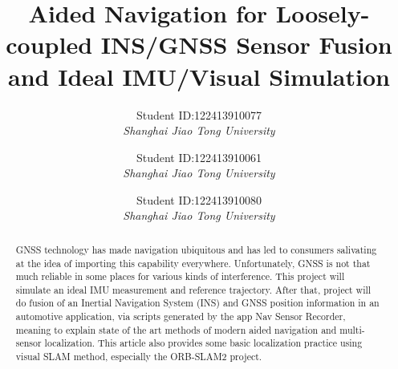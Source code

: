 \documentclass[conference]{IEEEtran}
\begin{document}
\title{Aided Navigation for Loosely-coupled INS/GNSS Sensor Fusion and Ideal IMU/Visual Simulation\\
}

\author{
Student ID:122413910077\\
\textit{Shanghai Jiao Tong University}\\

\and
{}
Student ID:122413910061\\
\textit{Shanghai Jiao Tong University}\\

\and
{}
Student ID:122413910080\\
\textit{Shanghai Jiao Tong University}\\

}

\maketitle

\begin{abstract}
GNSS technology has made navigation ubiquitous and has led to consumers salivating at the idea of importing this capability everywhere. Unfortunately, GNSS is not that much reliable in some places for various kinds of interference. This project will simulate an ideal IMU measurement and reference trajectory. After that, project will do fusion of an Inertial Navigation System (INS) and GNSS position information in an automotive application, via scripts generated by the app Nav Sensor Recorder, meaning to explain state of the art methods of modern aided navigation and multi-sensor localization.
This article also provides some basic localization practice using visual SLAM method,
especially the ORB-SLAM2 project.

\end{abstract}
\end{document}
